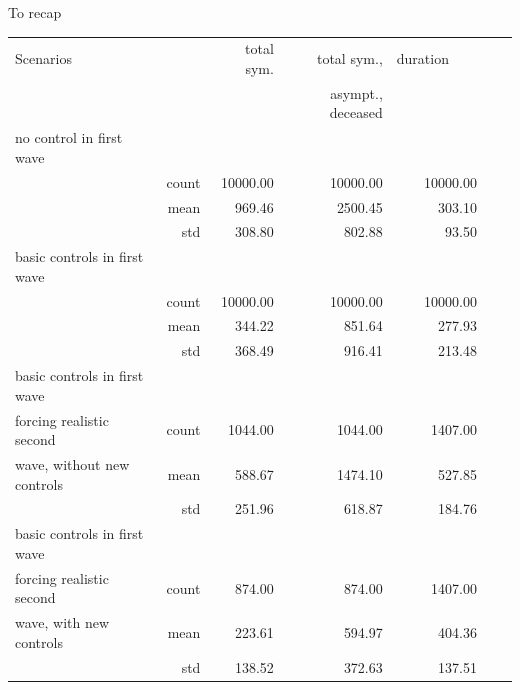 \documentclass[8pt]{beamer}
\begin{document}
\begin{frame}{To recap}

\begin{table}[H]
\center
\footnotesize
\begin{tabular}{lrrrrrr}
\toprule
Scenarios     &                         &  total sym.  & total sym.,       & duration~~~~  \\
                     &                         &                    & asympt., deceased   \\                               
\midrule
no control in first wave  \\
{}                                           & count &     10000.00 &                10000.00 &  10000.00 \\
{}                                           & mean  &       969.46 &                 2500.45 &    303.10 \\
{}                                           & std   &       308.80 &                  802.88 &     93.50 \\

\midrule
basic controls in first wave \\   
{}                                           & count &     10000.00 &                10000.00 &  10000.00 \\
{}                                           & mean  &       344.22 &                  851.64 &    277.93 \\
{}                                           & std   &       368.49 &                  916.41 &    213.48 \\
         
\midrule
basic controls in first wave \\   
forcing realistic second       & count &  1044.00 &                    1044.00 & 1407.00 \\
wave, without new controls & mean  &   588.67 &                    1474.10 &  527.85 \\
{}                                         & std   &   251.96 &                     618.87 &  184.76 \\

\midrule
basic controls in first wave \\   
forcing realistic second       & count &   874.00 &                     874.00 & 1407.00 \\
wave, with new controls     & mean  &   223.61 &                     594.97 &  404.36 \\
{}                                         & std   &   138.52 &                     372.63 &  137.51 \\


\end{tabular}
\end{table}
\end{frame}
\end{document}
